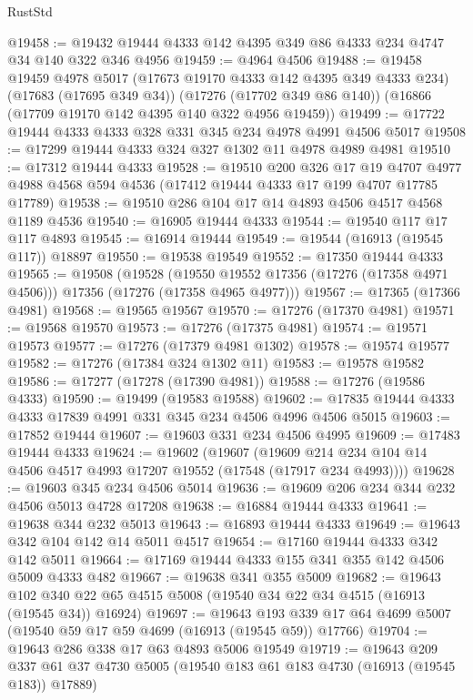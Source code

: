 \begin{lexlean}{RustStd}
\begin{coremodule}
@19458 := @19432 @19444 @4333 @142 @4395 @349 @86 @4333 @234 @4747 @34 @140 @322 @346 @4956
@19459 := @4964 @4506
@19488 := @19458
    @19459
    @4978
    @5017
    (@17673 @19170 @4333 @142 @4395 @349 @4333 @234)
    (@17683 (@17695 @349 @34))
    (@17276 (@17702 @349 @86 @140))
    (@16866 (@17709 @19170 @142 @4395 @140 @322 @4956 @19459))
@19499 := @17722 @19444 @4333 @4333 @328 @331 @345 @234 @4978 @4991 @4506 @5017
@19508 := @17299 @19444 @4333 @324 @327 @1302 @11 @4978 @4989 @4981
@19510 := @17312 @19444 @4333
@19528 := @19510
    @200
    @326
    @17
    @19
    @4707
    @4977
    @4988
    @4568
    @594
    @4536
    (@17412 @19444 @4333 @17 @199 @4707 @17785 @17789)
@19538 := @19510 @286 @104 @17 @14 @4893 @4506 @4517 @4568 @1189 @4536
@19540 := @16905 @19444 @4333
@19544 := @19540 @117 @17 @117 @4893
@19545 := @16914 @19444
@19549 := @19544 (@16913 (@19545 @117)) @18897
@19550 := @19538 @19549
@19552 := @17350 @19444 @4333
@19565 := @19508
    (@19528
      (@19550 @19552 @17356 (@17276 (@17358 @4971 @4506)))
      @17356
      (@17276 (@17358 @4965 @4977)))
@19567 := @17365 (@17366 @4981)
@19568 := @19565 @19567
@19570 := @17276 (@17370 @4981)
@19571 := @19568 @19570
@19573 := @17276 (@17375 @4981)
@19574 := @19571 @19573
@19577 := @17276 (@17379 @4981 @1302)
@19578 := @19574 @19577
@19582 := @17276 (@17384 @324 @1302 @11)
@19583 := @19578 @19582
@19586 := @17277 (@17278 (@17390 @4981))
@19588 := @17276 (@19586 @4333)
@19590 := @19499 (@19583 @19588)
@19602 := @17835 @19444 @4333 @4333 @17839 @4991 @331 @345 @234 @4506 @4996 @4506 @5015
@19603 := @17852 @19444
@19607 := @19603 @331 @234 @4506 @4995
@19609 := @17483 @19444 @4333
@19624 := @19602
    (@19607
      (@19609 @214 @234 @104 @14 @4506 @4517 @4993 @17207 @19552 (@17548 (@17917 @234 @4993))))
@19628 := @19603 @345 @234 @4506 @5014
@19636 := @19609 @206 @234 @344 @232 @4506 @5013 @4728 @17208
@19638 := @16884 @19444 @4333
@19641 := @19638 @344 @232 @5013
@19643 := @16893 @19444 @4333
@19649 := @19643 @342 @104 @142 @14 @5011 @4517
@19654 := @17160 @19444 @4333 @342 @142 @5011
@19664 := @17169 @19444 @4333 @155 @341 @355 @142 @4506 @5009 @4333 @482
@19667 := @19638 @341 @355 @5009
@19682 := @19643
    @102
    @340
    @22
    @65
    @4515
    @5008
    (@19540 @34 @22 @34 @4515 (@16913 (@19545 @34)) @16924)
@19697 := @19643
    @193
    @339
    @17
    @64
    @4699
    @5007
    (@19540 @59 @17 @59 @4699 (@16913 (@19545 @59)) @17766)
@19704 := @19643 @286 @338 @17 @63 @4893 @5006 @19549
@19719 := @19643
    @209
    @337
    @61
    @37
    @4730
    @5005
    (@19540 @183 @61 @183 @4730 (@16913 (@19545 @183)) @17889)

\end{coremodule}
\end{lexlean}
